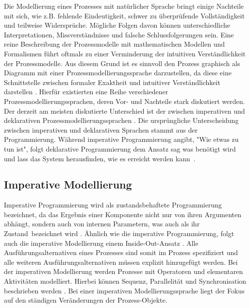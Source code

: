 Die Modellierung eines Prozesses mit natürlicher Sprache bringt einige Nachteile mit sich, wie z.B. fehlende Eindeutigkeit, schwer zu überprüfende Vollständigkeit und teilweise Widersprüche. Mögliche Folgen davon können unterschiedliche Interpretationen, Missverständnisse und falsche Schlussfolgerungen sein. Eine reine Beschreibung der Prozessmodelle mit mathematischen Modellen und Formalismen führt oftmals zu einer Verminderung der intuitiven Verständlichkeit der Prozessmodelle. Aus diesem Grund ist es sinnvoll den Prozess graphisch als Diagramm mit einer Prozessmodellierungssprache darzustellen, da diese eine Schnittstelle zwischen formaler Exaktheit und intuitiver Verständlichkeit darstellen \cite{thomas2009,kircher2006}.  \newline
Hierfür existierten eine Reihe verschiedener Prozessmodellierungssprachen, deren Vor- und Nachteile stark diskutiert werden. Der derzeit am meisten diskutierte Unterschied ist der zwischen imperativen und deklarativen Prozessmodellierungssprachen \cite{fahland2009}. \newline
Die ursprüngliche Unterscheidung zwischen imperativen und deklarativen Sprachen stammt aus der Programmierung. Während imperative Programmierung angibt, "Wie etwas zu tun ist", folgt deklarative Programmierung dem Ansatz \grqq sag was benötigt wird und lass das System herausfinden, wie es erreicht werden kann\grqq \ \cite{pichler2012}.

\subsection{Imperative Modellierung}
Imperative Programmierung wird als zustandsbehaftete Programmierung bezeichnet, da das  Ergebnis einer Komponente nicht nur von ihren Argumenten abhängt, sondern auch von internen Parametern, was auch als ihr \grqq Zustand\grqq \  bezeichnet wird \cite{fahland2009}.  \newline
Ähnlich wie die imperative Programmierung, folgt auch die imperative Modellierung einem \grqq Inside-Out-Ansatz \grqq. Alle Ausführungsalternativen eines Prozesses sind somit im Prozess spezifiziert und alle weiteren Ausführungsalternativen müssen explizit hinzugefügt werden. Bei der imperativen Modellierung werden Prozesse mit Operatoren und elementaren Aktivitäten modelliert. Hierbei können Sequenz, Parallelität und Synchronisation beschrieben werden \cite{kaschek1998}. Bei einer imperativen Modellierungssprache liegt der Fokus auf den ständigen Veränderungen der Prozess-Objekte.


